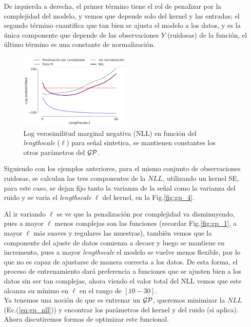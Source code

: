 De izquierda a derecha, el primer término tiene el rol de penalizar por la complejidad del modelo, y vemos que depende solo del kernel y las entradas; el segundo término cuantifica que tan bien se ajusta el modelo a los datos, y es la única componente que depende de las observaciones $Y$ (ruidosas) de la función, el último término es una constante de normalización.\\


\begin{figure}[H]
	\centering
	\includegraphics[width=0.5\textwidth]{img/cap6_gp_nll_partes}
	\caption{Log verosimilitud marginal negativa (NLL) en función del \textit{lengthscale} ($\ell$) para señal sintetica, se mantienen constantes los otros parámetros del $\mathcal{GP}$.}\label{fig:gp_4}
	\label{fig:nll_por partes}
\end{figure}

Siguiendo con los ejemplos anteriores, para el mismo conjunto de observaciones ruidosas, se calculan las tres componentes de la $NLL$, utilizando un kernel SE, para este caso, se dejan fijo tanto la varianza de la señal como la varianza del ruido y se varia el \textit{lengthscale} $\ell$ del kernel, en la Fig.\ref{fig:gp_4}.

Al ir variando $\ell$ se ve que la penalización por complejidad va disminuyendo, pues a mayor $\ell$ menos complejas son las funciones (recordar Fig.\ref{fig:gp_1}, a mayor $\ell$ más suaves y regulares las muestras), también vemos que la componente del ajuste de datos comienza a decaer y luego se mantiene en incremento, pues a mayor \textit{lengthscale} el modelo se vuelve menos flexible, por lo que no es capaz de ajustarse de manera correcta a los datos. De esta forma, el proceso de entrenamiento dará preferencia a funciones que se ajusten bien a los datos sin ser tan complejas, ahora viendo el valor total del NLL vemos que este alcanza su mínimo en $\ell$ en el rango de $[10-30]$.\\


Ya tenemos una noción de que es entrenar un $\mathcal{GP}$, queremos minimizar la $NLL$ (Ec.(\ref{eq:gp_nll})) y encontrar los parámetros del kernel y del ruido (si aplica). Ahora discutiremos formas de optimizar este funcional.\\

